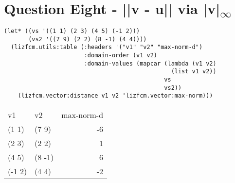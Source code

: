 \documentclass[11pt]{article}
\begin{document}
\section{Question Eight - ||v - u|| via |v|\textsubscript{\(\infty\)}}
\label{sec:org6e77f76}
\begin{verbatim}
(let* ((vs '((1 1) (2 3) (4 5) (-1 2)))
       (vs2 '((7 9) (2 2) (8 -1) (4 4))))
  (lizfcm.utils:table (:headers '("v1" "v2" "max-norm-d")
                       :domain-order (v1 v2)
                       :domain-values (mapcar (lambda (v1 v2)
                                                (list v1 v2))
                                              vs
                                              vs2))
    (lizfcm.vector:distance v1 v2 'lizfcm.vector:max-norm)))
\end{verbatim}

\begin{center}
\begin{tabular}{llr}
v1 & v2 & max-norm-d\\[0pt]
(1 1) & (7 9) & -6\\[0pt]
(2 3) & (2 2) & 1\\[0pt]
(4 5) & (8 -1) & 6\\[0pt]
(-1 2) & (4 4) & -2\\[0pt]
\end{tabular}
\end{center}
\end{document}
